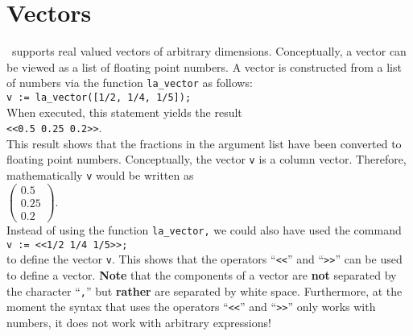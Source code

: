 \section{Vectors}
\setlx\ supports real valued vectors of arbitrary dimensions.  Conceptually, a vector can be viewed as
a list of floating point numbers.  A vector is constructed from a list of numbers via the
function \texttt{la\_vector} as follows:
\\[0.2cm]
\hspace*{1.3cm}
\texttt{v := la\_vector([1/2, 1/4, 1/5]);}
\\[0.2cm]
When executed, this statement yields the result
\\[0.2cm]
\hspace*{1.3cm}
\texttt{<<0.5 0.25 0.2>>}.
\\[0.2cm]
This result shows that the fractions in the argument list have been converted to floating point
numbers.  Conceptually, the vector \texttt{v} is a column vector.  Therefore, mathematically
\texttt{v} would be written as
\\[0.2cm]
\hspace*{1.3cm}
$
\left(\begin{array}{l}
  0.5  \\
  0.25 \\
  0.2
\end{array}\right)
$.
\\[0.2cm]
Instead of using the function \texttt{la\_vector,} we could also have used the command
\\[0.2cm]
\hspace*{1.3cm}
\texttt{v := <<1/2 1/4 1/5>>;}
\\[0.2cm]
to define the vector \texttt{v}.  This shows that the operators ``\texttt{<<}'' and ``\texttt{>>}''
can be used to define a vector.  \textbf{Note} that the components of a vector are \textbf{not} separated by the
character ``\texttt{,}'' but \textbf{rather} are separated by white space.  Furthermore, at the
moment the syntax that uses the operators ``\texttt{<<}'' and ``\texttt{>>}'' only works with
numbers, it does not work with arbitrary expressions!

